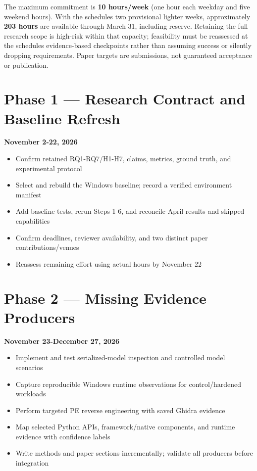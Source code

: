 \documentclass[
  12pt,
  letterpaper,
  oneside]{report}
\providecommand{\tightlist}{%
  \setlength{\itemsep}{0pt}\setlength{\parskip}{0pt}}
\begin{document}
The maximum commitment is \textbf{10 hours/week} (one hour each weekday
and five weekend hours). With the schedule\textquotesingle s two
provisional lighter weeks, approximately \textbf{203 hours} are
available through March 31, including reserve. Retaining the full
research scope is high-risk within that capacity; feasibility must be
reassessed at the schedule\textquotesingle s evidence-based checkpoints
rather than assuming success or silently dropping requirements. Paper
targets are submissions, not guaranteed acceptance or publication.

\section{Phase 1 --- Research Contract and Baseline
Refresh}\label{phase-1--research-contract-and-baseline-refresh}

\textbf{November 2-22, 2026}

\begin{itemize}
\tightlist
\item
  Confirm retained RQ1-RQ7/H1-H7, claims, metrics, ground truth, and
  experimental protocol
\item
  Select and rebuild the Windows baseline; record a verified environment
  manifest
\item
  Add baseline tests, rerun Steps 1-6, and reconcile April results and
  skipped capabilities
\item
  Confirm deadlines, reviewer availability, and two distinct paper
  contributions/venues
\item
  Reassess remaining effort using actual hours by November 22
\end{itemize}

\section{Phase 2 --- Missing Evidence
Producers}\label{phase-2--missing-evidence-producers}

\textbf{November 23-December 27, 2026}

\begin{itemize}
\tightlist
\item
  Implement and test serialized-model inspection and controlled model
  scenarios
\item
  Capture reproducible Windows runtime observations for control/hardened
  workloads
\item
  Perform targeted PE reverse engineering with saved Ghidra evidence
\item
  Map selected Python APIs, framework/native components, and runtime
  evidence with confidence labels
\item
  Write methods and paper sections incrementally; validate all producers
  before integration
\end{itemize}
\end{document}
